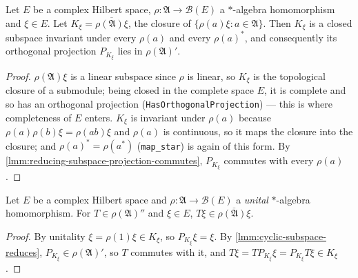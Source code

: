 \begin{lemma}
    \label{lmm:cyclic-subspace-reduces}
    \leanok
    Let $E$ be a complex Hilbert space, $\rho : \mathfrak{A} \to \mathcal{B}(E)$ a $*$-algebra homomorphism and $\xi \in E$. Let $K_\xi = \overline{\rho(\mathfrak{A})\xi}$, the closure of $\{\rho(a)\xi : a \in \mathfrak{A}\}$. Then $K_\xi$ is a closed subspace invariant under every $\rho(a)$ and every $\rho(a)^*$, and consequently its orthogonal projection $P_{K_\xi}$ lies in $\rho(\mathfrak{A})'$.
\end{lemma}
\begin{proof}
    \leanok
    $\rho(\mathfrak{A})\xi$ is a linear subspace since $\rho$ is linear, so $K_\xi$ is the topological closure of a submodule; being closed in the complete space $E$, it is complete and so has an orthogonal projection (\texttt{HasOrthogonalProjection}) --- this is where completeness of $E$ enters. $K_\xi$ is invariant under $\rho(a)$ because $\rho(a)\rho(b)\xi = \rho(ab)\xi$ and $\rho(a)$ is continuous, so it maps the closure into the closure; and $\rho(a)^* = \rho(a^*)$ (\texttt{map\_star}) is again of this form. By \ref{lmm:reducing-subspace-projection-commutes}, $P_{K_\xi}$ commutes with every $\rho(a)$.
\end{proof}

\begin{lemma}
    \label{lmm:bicommutant-single-vector}
    \leanok
    Let $E$ be a complex Hilbert space and $\rho : \mathfrak{A} \to \mathcal{B}(E)$ a \emph{unital} $*$-algebra homomorphism. For $T \in \rho(\mathfrak{A})''$ and $\xi \in E$, $T\xi \in \overline{\rho(\mathfrak{A})\xi}$.
\end{lemma}
\begin{proof}
    \leanok
    By unitality $\xi = \rho(1)\xi \in K_\xi$, so $P_{K_\xi}\xi = \xi$. By \ref{lmm:cyclic-subspace-reduces}, $P_{K_\xi} \in \rho(\mathfrak{A})'$, so $T$ commutes with it, and $T\xi = T P_{K_\xi}\xi = P_{K_\xi} T\xi \in K_\xi$.
\end{proof}


